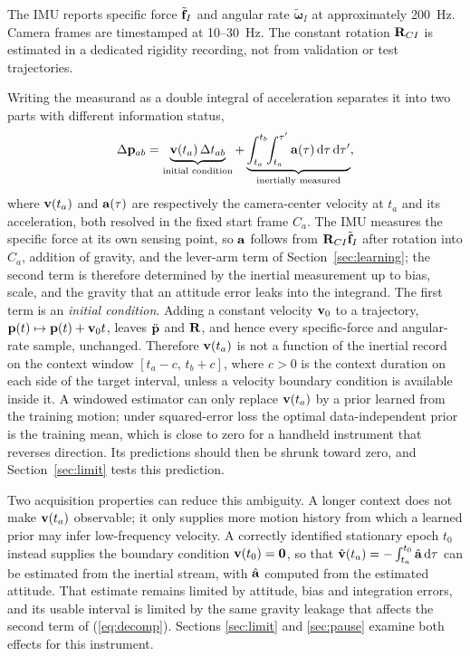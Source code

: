 The IMU reports specific force $\tilde{\bf f}_I$ and angular rate
$\tilde{\boldsymbol\omega}_I$ at approximately 200~Hz. Camera frames are
timestamped at 10--30~Hz. The constant rotation ${\bf R}_{CI}$ is estimated
in a dedicated rigidity recording, not from validation or test trajectories.

\label{sec:observable}
Writing the measurand as a double integral of acceleration separates it into
two parts with different information status,
\begin{equation}
 \Delta{\bf p}_{ab}=
 \underbrace{{\bf v}(t_a)\,\Delta t_{ab}}_{\text{initial condition}}
 +\underbrace{\int_{t_a}^{t_b}\!\!\int_{t_a}^{\tau'}{\bf a}(\tau)\,
 {\rm d}\tau\,{\rm d}\tau'}_{\text{inertially measured}},
 \label{eq:decomp}
\end{equation}
where ${\bf v}(t_a)$ and ${\bf a}(\tau)$ are respectively the camera-center
velocity at $t_a$ and its acceleration, both resolved in the fixed start frame
$C_a$. The IMU measures the specific force at its own sensing point, so
${\bf a}$ follows from ${\bf R}_{CI}\tilde{\bf f}_I$ after rotation into
$C_a$, addition of gravity, and the lever-arm term of
Section~\ref{sec:learning}; the second term is therefore determined by the
inertial measurement up to bias, scale, and the gravity that an attitude error
leaks into the integrand. The first term is an \emph{initial condition}. Adding
a constant velocity ${\bf v}_0$ to a trajectory,
${\bf p}(t)\mapsto{\bf p}(t)+{\bf v}_0t$, leaves $\ddot{\bf p}$ and ${\bf R}$,
and hence every specific-force and angular-rate sample, unchanged. Therefore
${\bf v}(t_a)$ is not a function of the inertial record on the context window
$[t_a-c,\,t_b+c]$, where $c>0$ is the context duration on each side of the
target interval, unless a velocity boundary condition is available inside it.
A windowed estimator can only replace ${\bf v}(t_a)$ by a prior learned from
the training motion; under squared-error loss the optimal data-independent
prior is the training mean, which is close to zero for a handheld instrument
that reverses direction. Its predictions should then be shrunk toward zero,
and Section~\ref{sec:limit} tests this prediction.

Two acquisition properties can reduce this ambiguity. A longer context does
not make ${\bf v}(t_a)$ observable; it only supplies more motion history from
which a learned prior may infer low-frequency velocity. A correctly
identified stationary epoch $t_0$ instead supplies the boundary condition
${\bf v}(t_0)={\bf0}$, so that
$\hat{\bf v}(t_a)=-\int_{t_a}^{t_0}\hat{\bf a}\,{\rm d}\tau$ can be estimated
from the inertial stream, with $\hat{\bf a}$ computed from the estimated
attitude. That estimate remains limited by attitude, bias and
integration errors, and its usable interval is limited by the same gravity
leakage that affects the second term of (\ref{eq:decomp}). Sections
\ref{sec:limit} and \ref{sec:pause} examine both effects for this
instrument.

